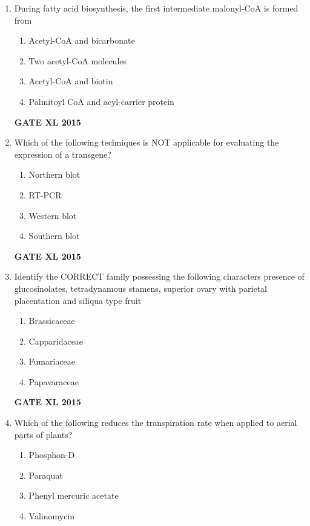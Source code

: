 \documentclass[journal,12pt,onecolumn]{IEEEtran}
\begin{document}
\begin{enumerate}
\item During fatty acid biosynthesis, the first intermediate malonyl-CoA is formed from 
    \begin{enumerate}
            \item Acetyl-CoA and bicarbonate
	    \item Two acetyl-CoA molecules
	    \item Acetyl-CoA and biotin
            \item  Palmitoyl CoA and acyl-carrier protein 
	\end{enumerate}
\begin{flushright}\textbf{GATE XL 2015}\end{flushright}
\item  Which of the following techniques is NOT applicable for evaluating the expression of a transgene?
        \begin{enumerate} 
            \item Northern blot
	    \item RT-PCR
	    \item Western blot
            \item Southern blot
	\end{enumerate}
\begin{flushright}\textbf{GATE XL 2015}\end{flushright}
\item Identify the CORRECT family possessing the following characters presence of glucosinolates, tetradynamous stamens, superior ovary with parietal placentation and siliqua type fruit
        \begin{enumerate} 
            \item Brassicaceae
	    \item Capparidaceae
	    \item Fumariaceae
            \item Papavaraceae
    \end{enumerate}
\begin{flushright}\textbf{GATE XL 2015}\end{flushright}
\item Which of the following reduces the transpiration rate when applied to aerial parts of plants?
    \begin{enumerate}
            \item Phosphon-D
	    \item Paraquat
	    \item Phenyl mercuric acetate
            \item Valinomycin

\end{enumerate}
\end{enumerate}
\end{document}
